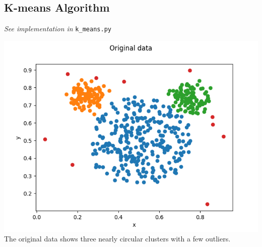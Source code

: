     \subsection{K-means Algorithm}
    \textit{See implementation in} \texttt{k\_means.py}

    \includegraphics[width=\textwidth/2]{plots/mickey_original} \\
    The original data shows three nearly circular clusters with a few outliers.

